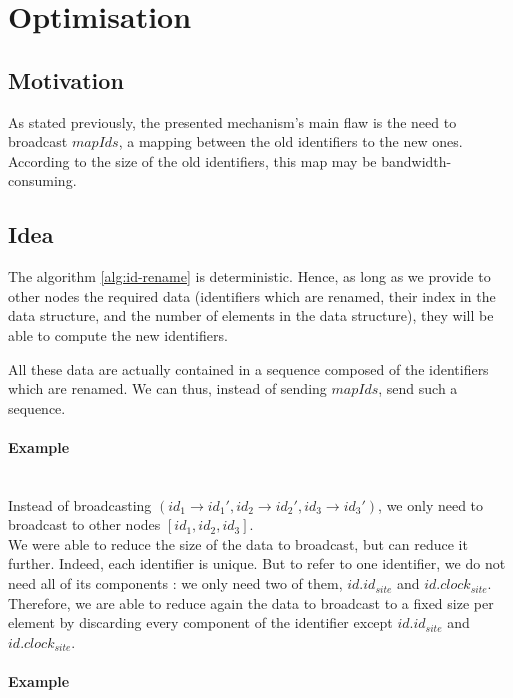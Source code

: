 \documentclass[a4paper]{article}
\begin{document}
\section{Optimisation}

\subsection{Motivation}

As stated previously, the presented mechanism's main flaw is the need to broadcast
$mapIds$, a mapping between the old identifiers to the new ones.
According to the size of the old identifiers, this map may be bandwidth-consuming.

\subsection{Idea}

The algorithm \ref{alg:id-rename} is deterministic. Hence, as long as we provide
to other nodes the required data (identifiers which are renamed,
their index in the data structure, and the number of elements in the data structure),
they will be able to compute the new identifiers.

All these data are actually contained in a sequence composed of the identifiers
which are renamed. We can thus, instead of sending $mapIds$, send such a sequence.

\paragraph{Example}~\\

Instead of broadcasting $(id_1 \rightarrow id_1', id_2 \rightarrow id_2', id_3 \rightarrow id_3')$,
we only need to broadcast to other nodes $[id_1, id_2, id_3]$.\\

We were able to reduce the size of the data to broadcast, but can reduce it further.
Indeed, each identifier is unique. But to refer to one identifier, we do not
need all of its components : we only need two of them, $id.id_{site}$ and $id.clock_{site}$.
Therefore, we are able to reduce again the data to broadcast to a fixed size per element
by discarding every component of the identifier except $id.id_{site}$ and $id.clock_{site}$.

\paragraph{Example}~\\
\end{document}
